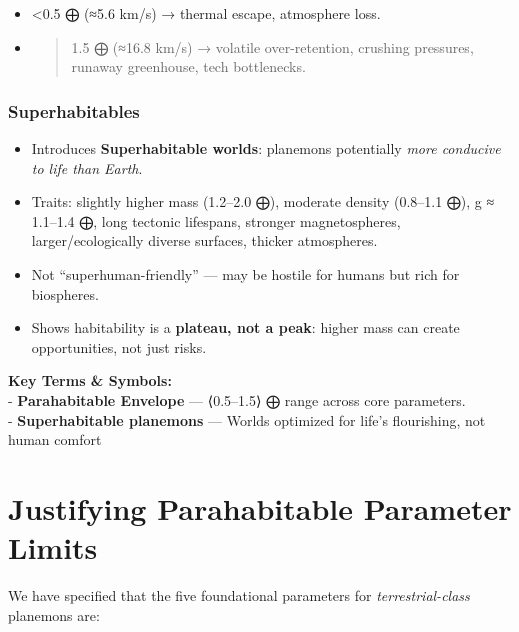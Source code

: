 \documentclass[
  letterpaper,
]{book}
\providecommand{\tightlist}{%
  \setlength{\itemsep}{0pt}\setlength{\parskip}{0pt}}
\begin{document}
\begin{itemize}
  \begin{itemize}
  \item
    \textless0.5 ⨁ (≈5.6 km/s) → thermal escape, atmosphere loss.\\
  \item
    \begin{quote}
    1.5 ⨁ (≈16.8 km/s) → volatile over-retention, crushing pressures,
    runaway greenhouse, tech bottlenecks.
    \end{quote}
  \end{itemize}
\end{itemize}

\subsection{Superhabitables}\label{superhabitables}

\begin{itemize}
\tightlist
\item
  Introduces \textbf{Superhabitable worlds}: planemons potentially
  \emph{more conducive to life than Earth}.\\
\item
  Traits: slightly higher mass (1.2--2.0 ⨁), moderate density (0.8--1.1
  ⨁), g ≈ 1.1--1.4 ⨁, long tectonic lifespans, stronger magnetospheres,
  larger/ecologically diverse surfaces, thicker atmospheres.\\
\item
  Not ``superhuman-friendly'' --- may be hostile for humans but rich for
  biospheres.\\
\item
  Shows habitability is a \textbf{plateau, not a peak}: higher mass can
  create opportunities, not just risks.
\end{itemize}

\textbf{Key Terms \& Symbols:}\\
- \textbf{Parahabitable Envelope} --- ⟨0.5--1.5⟩ ⨁ range across core
parameters.\\
- \textbf{Superhabitable planemons} --- Worlds optimized for life's
flourishing, not human comfort

\chapter{Justifying Parahabitable Parameter
Limits}\label{justifying-parahabitable-parameter-limits}

We have specified that the five foundational parameters for
\emph{terrestrial-class} planemons are:
\end{document}
